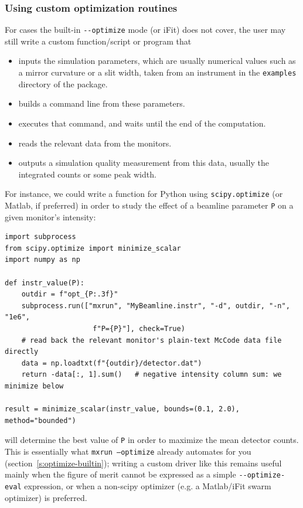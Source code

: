 \subsubsection{Using custom optimization routines}
For cases the built-in \verb+--optimize+ mode (or iFit) does not cover, the
user may still write a custom function/script or program that
\begin{itemize}
\item inputs the simulation parameters, which are usually numerical values such
  as a mirror curvature or a slit width, taken from an instrument in the
  \verb+examples+ directory of the package.
\item builds a command line from these parameters.
\item executes that command, and waits until the end of the computation.
\item reads the relevant data from the monitors.
\item outputs a simulation quality measurement from this data, usually the
  integrated counts or some peak width.
\end{itemize}

For instance, we could write a function for Python using
\texttt{scipy.optimize} (or Matlab, if preferred) in order to study the
effect of a beamline parameter \texttt{P} on a given monitor's intensity:
\begin{lstlisting}
import subprocess
from scipy.optimize import minimize_scalar
import numpy as np

def instr_value(P):
    outdir = f"opt_{P:.3f}"
    subprocess.run(["mxrun", "MyBeamline.instr", "-d", outdir, "-n", "1e6",
                     f"P={P}"], check=True)
    # read back the relevant monitor's plain-text McCode data file directly
    data = np.loadtxt(f"{outdir}/detector.dat")
    return -data[:, 1].sum()   # negative intensity column sum: we minimize below

result = minimize_scalar(instr_value, bounds=(0.1, 2.0), method="bounded")
\end{lstlisting}
will determine the best value of \texttt{P} in order to maximize the mean
detector counts. This is essentially what \texttt{mxrun --optimize} already
automates for you (section~\ref{s:optimize-builtin}); writing a custom driver
like this remains useful mainly when the figure of merit cannot be expressed
as a simple \verb+--optimize-eval+ expression, or when a non-scipy optimizer
(e.g. a Matlab/iFit swarm optimizer) is preferred.

